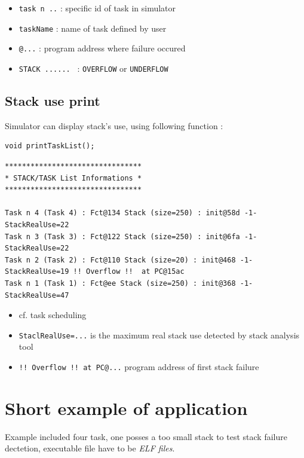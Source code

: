  \begin{itemize}
	\item  {\tt task n ..} : specific id of task in simulator
	\item {\tt taskName} : name of task defined by user
	\item  {\tt @...} : program address where failure occured
	\item  {\tt STACK ...... } : {\tt OVERFLOW} or {\tt UNDERFLOW}
\end{itemize}

\subsection{Stack use print}
\noindent Simulator can display stack's use, using following function :
\begin{lstlisting}
void printTaskList();
 \end{lstlisting}
 
 \begin{verbatim}
********************************
* STACK/TASK List Informations *
********************************

Task n 4 (Task 4) : Fct@134 Stack (size=250) : init@58d -1- StackRealUse=22
Task n 3 (Task 3) : Fct@122 Stack (size=250) : init@6fa -1- StackRealUse=22
Task n 2 (Task 2) : Fct@110 Stack (size=20) : init@468 -1- StackRealUse=19 !! Overflow !!  at PC@15ac
Task n 1 (Task 1) : Fct@ee Stack (size=250) : init@368 -1- StackRealUse=47
\end{verbatim}

 \begin{itemize}
	\item  cf. task scheduling
	\item  {\tt StaclRealUse=...} is the maximum real stack use detected by stack analysis tool
	\item {\tt !! Overflow !! at PC@...} program address of first stack failure
\end{itemize}
 
\section{Short example of application}
Example included four task, one posses a too small stack to test stack failure dectetion, executable file have to be \emph{ELF files}.
